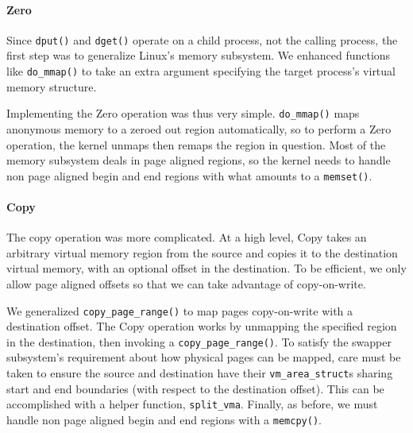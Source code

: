 \begin{itemize}
\paragraph{Zero}
Since {\tt dput()} and {\tt dget()} operate on a child process, not the calling
process, the first step  was to generalize Linux's memory subsystem. We enhanced
functions like {\tt do\_mmap()} to take an extra argument specifying the
target process's virtual memory structure.

Implementing the Zero operation was thus very simple. {\tt do\_mmap()} maps
anonymous memory to a zeroed out region automatically, so to perform a Zero
operation, the kernel unmaps then remaps the region in question. Most of the
memory subsystem deals in page aligned regions, so the kernel needs to handle
non page aligned begin and end regions with what amounts to a {\tt memset()}.

\paragraph{Copy}
The copy operation was more complicated. At a high level, Copy takes an
arbitrary virtual memory region from the source and copies it to the
destination virtual memory, with an optional offset in the destination. To be
efficient, we only allow page aligned offsets so that we can take advantage of
copy-on-write.

We generalized {\tt copy\_page\_range()} to map pages copy-on-write with a
destination offset. The Copy operation works by unmapping the specified region
in the destination, then invoking a {\tt copy\_page\_range()}. To satisfy
the swapper subsystem's requirement about how physical pages can be mapped,
care must be taken to ensure the source and destination have their
{\tt vm\_area\_struct}s sharing start and end boundaries (with respect to the
destination offset). This can be accomplished with a helper function,
{\tt split\_vma}. Finally, as before, we must handle
non page aligned begin and end regions with a {\tt memcpy()}.


\end{itemize}
